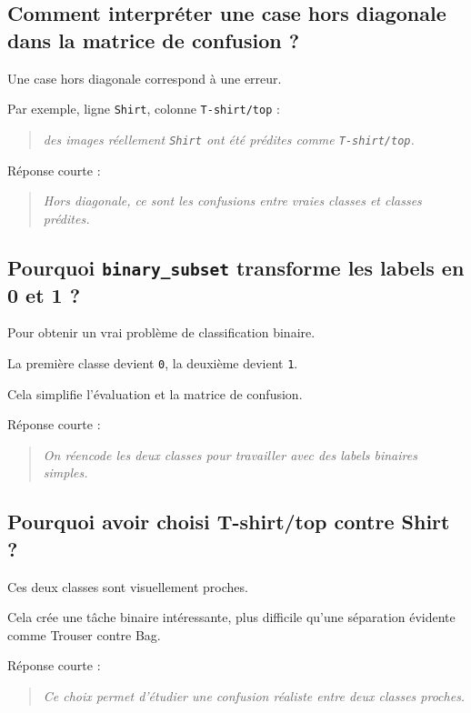 \documentclass[11pt,a4paper]{article}
\begin{document}
\subsection{Comment interpréter une case hors diagonale dans la matrice de confusion ?}

Une case hors diagonale correspond à une erreur.

Par exemple, ligne \texttt{Shirt}, colonne \texttt{T-shirt/top} :

\begin{quote}
\itshape des images réellement \texttt{Shirt} ont été prédites comme \texttt{T-shirt/top}.
\end{quote}

Réponse courte :

\begin{quote}
\itshape Hors diagonale, ce sont les confusions entre vraies classes et classes prédites.
\end{quote}

\subsection{Pourquoi \texttt{binary\_subset} transforme les labels en 0 et 1 ?}

Pour obtenir un vrai problème de classification binaire.

La première classe devient \texttt{0}, la deuxième devient \texttt{1}.

Cela simplifie l'évaluation et la matrice de confusion.

Réponse courte :

\begin{quote}
\itshape On réencode les deux classes pour travailler avec des labels binaires simples.
\end{quote}

\subsection{Pourquoi avoir choisi T-shirt/top contre Shirt ?}

Ces deux classes sont visuellement proches.

Cela crée une tâche binaire intéressante, plus difficile qu'une séparation évidente comme Trouser contre Bag.

Réponse courte :

\begin{quote}
\itshape Ce choix permet d'étudier une confusion réaliste entre deux classes proches.
\end{quote}
\end{document}
